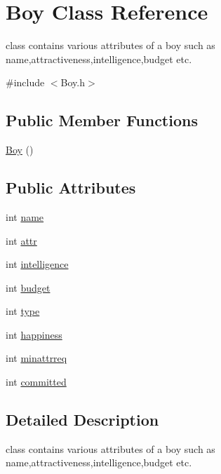 \hypertarget{classBoy}{}\section{Boy Class Reference}
\label{classBoy}


class contains various attributes of a boy such as name,attractiveness,intelligence,budget etc.  




{\ttfamily \#include $<$Boy.\+h$>$}

\subsection*{Public Member Functions}
\begin{DoxyCompactItemize}
\item 
\hyperlink{classBoy_abf3fa0c595a477813bf10ca6e665d3d3}{Boy} ()
\end{DoxyCompactItemize}
\subsection*{Public Attributes}
\begin{DoxyCompactItemize}
\item 
int \hyperlink{classBoy_ae4e7057e134fc1ad61aa245220b01e5a}{name}
\item 
int \hyperlink{classBoy_adbc26133f1d3325f5b06b48baf4af077}{attr}
\item 
int \hyperlink{classBoy_a10f24ab1e3dbee6fac2a122c76954fa5}{intelligence}
\item 
int \hyperlink{classBoy_a3b755250e77f892967872c7eb4c26685}{budget}
\item 
int \hyperlink{classBoy_a1b907f52b73e8355ce0dd02db65afa4f}{type}
\item 
int \hyperlink{classBoy_adaf15f15972678dbd77e8b8b319d5767}{happiness}
\item 
int \hyperlink{classBoy_a27a29b1780caee1e017280bc08405662}{minattrreq}
\item 
int \hyperlink{classBoy_ab92b452f9cf9d97fc0c0f8aa6139da46}{committed}
\end{DoxyCompactItemize}


\subsection{Detailed Description}
class contains various attributes of a boy such as name,attractiveness,intelligence,budget etc. 

